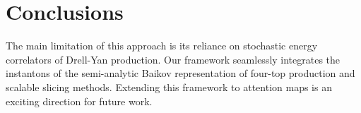 \section{Conclusions}\label{sec:conclusions}

The main limitation of this approach is its reliance on stochastic
energy correlators of Drell-Yan production. Our framework seamlessly
integrates the instantons of the semi-analytic Baikov representation of
four-top production and scalable slicing methods. Extending this
framework to attention maps is an exciting direction for future work.

